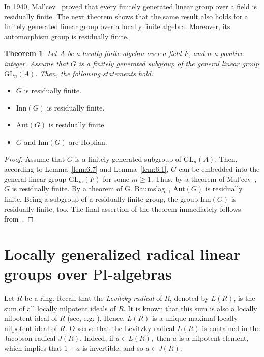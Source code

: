 \documentclass{amsart}
\newtheorem{theorem}{Theorem}[section]
\theoremstyle{definition}
\begin{document}
In 1940, Mal'cev~\cite{Pa_mal'cev_1940} proved that every finitely generated linear group over a field is residually finite. The next theorem shows that the same result also holds for a finitely generated linear group over a locally finite algebra. Moreover, its automorphism group is residually finite.
\begin{theorem}\label{th:6.15} Let $A$ be a locally finite algebra over a field $F$, and $n$ a positive integer. Assume that $G$ is a finitely generated subgroup of the general linear group $\mathrm{GL}_n(A).$ Then, the following statements hold:
\end{theorem}
\begin{itemize}
\item [(1)] $G$ is residually finite.
\item [(2)] $\mathrm{Inn}(G)$ is residually finite.
\item [(3)] $\mathrm{Aut}(G)$ is residually finite.
\item [(4)] $G$ and $\mathrm{Inn}(G)$ are Hopfian.
\end{itemize}
\begin{proof} Assume that $G$ is a finitely generated subgroup of $\mathrm{GL}_n(A).$ Then, according to Lemma~\ref{lem:6.7} and Lemma~\ref{lem:6.1}, $G$ can be embedded into the general linear group $\mathrm{GL}_m(F)$ for some $m\geq 1.$ Thus, by a theorem of Mal'cev~\cite{Pa_mal'cev_1940}, $G$ is residually finite. By a theorem of G. Baumslag~\cite[Theorem 1]{Pa_Baumslag_1963}, $\mathrm{Aut}(G)$ is residually finite. Being a subgroup of a residually finite group, the group $\mathrm{Inn}(G)$ is residually finite, too. The final assertion of the theorem immediately follows from~\cite[Theorem 2.4.3]{Bo_SilberCoor_2010}.
\end{proof}
\section{Locally generalized radical linear groups over $\mathrm{PI}$-algebras}\label{S7}
Let $R$ be a ring. Recall that the \textit{Levitzky radical} of $R$, denoted by $L(R)$, is the sum of all locally nilpotent ideals of $R$. It is known that this sum is also a locally nilpotent ideal of $R$ (see, e.g. \cite[Proposition 1, p.197]{Bo_Jacobson_1964}). Hence, $L(R)$ is a unique maximal locally nilpotent ideal of $R$. Observe that the Levitzky radical $L(R)$ is contained in the Jacobson radical $J(R)$. Indeed, if $a\in L(R),$ then $a$ is a nilpotent element, which implies that $1+a$ is invertible, and so $a\in J(R)$. 
\end{document}
